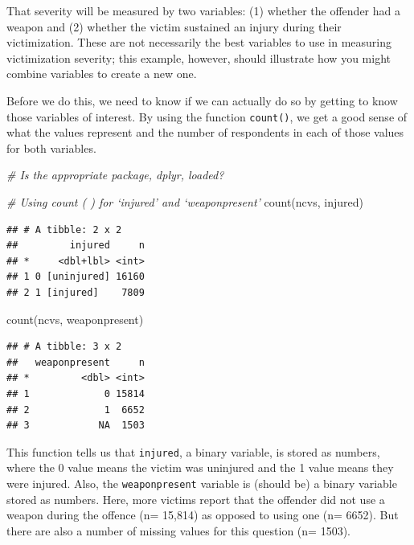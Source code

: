 \documentclass[
]{book}
\newenvironment{Shaded}{\begin{snugshade}}{\end{snugshade}}
\newcommand{\CommentTok}[1]{\textcolor[rgb]{0.56,0.35,0.01}{\textit{#1}}}
\newcommand{\FunctionTok}[1]{\textcolor[rgb]{0.00,0.00,0.00}{#1}}
\newcommand{\NormalTok}[1]{#1}
\begin{document}
That severity will be measured by two variables: (1) whether the offender had a weapon and (2) whether the victim sustained an injury during their victimization. These are not necessarily the best variables to use in measuring victimization severity; this example, however, should illustrate how you might combine variables to create a new one.

Before we do this, we need to know if we can actually do so by getting to know those variables of interest. By using the function \texttt{count()}, we get a good sense of what the values represent and the number of respondents in each of those values for both variables.

\begin{Shaded}
\begin{Highlighting}[]
\CommentTok{\# Is the appropriate package, \textquotesingle{}dplyr\textquotesingle{}, loaded?}

\CommentTok{\# Using count ( ) for ‘injured’ and ‘weaponpresent’}
\FunctionTok{count}\NormalTok{(ncvs, injured)}
\end{Highlighting}
\end{Shaded}

\begin{verbatim}
## # A tibble: 2 x 2
##         injured     n
## *     <dbl+lbl> <int>
## 1 0 [uninjured] 16160
## 2 1 [injured]    7809
\end{verbatim}

\begin{Shaded}
\begin{Highlighting}[]
\FunctionTok{count}\NormalTok{(ncvs, weaponpresent)}
\end{Highlighting}
\end{Shaded}

\begin{verbatim}
## # A tibble: 3 x 2
##   weaponpresent     n
## *         <dbl> <int>
## 1             0 15814
## 2             1  6652
## 3            NA  1503
\end{verbatim}

This function tells us that \texttt{injured}, a binary variable, is stored as numbers, where the 0 value means the victim was uninjured and the 1 value means they were injured. Also, the \texttt{weaponpresent} variable is (should be) a binary variable stored as numbers. Here, more victims report that the offender did not use a weapon during the offence (n= 15,814) as opposed to using one (n= 6652). But there are also a number of missing values for this question (n= 1503).
\end{document}

